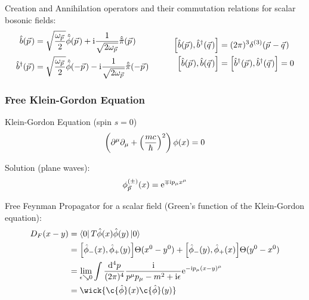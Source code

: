 			\noindent
			Creation and Annihilation operators and their commutation relations for scalar bosonic fields:
			\begin{equation}
				\begin{aligned}
					\hat{b}(\vec{p}) &= \sqrt{\frac{\omega_{\vec{p}}}{2}} \hat{\tilde{\phi}}(\vec{p}) + \i \frac{1}{\sqrt{2 \omega_{\vec{p}}}} \hat{\tilde{\pi}}(\vec{p}) \\
					\hat{b}^\dagger(\vec{p}) &= \sqrt{\frac{\omega_{\vec{p}}}{2}} \hat{\tilde{\phi}}(-\vec{p}) - \i \frac{1}{\sqrt{2 \omega_{\vec{p}}}} \hat{\tilde{\pi}}(-\vec{p}) 
				\end{aligned}				
				\hsp
				\begin{aligned}
					\comm{\hat{b}(\vec{p})}{\hat{b}^\dagger(\vec{q})} &= (2\pi)^3 \delta^{(3)}(\vec{p}-\vec{q}) \\
					\Big[ \hat{b}(\vec{p}) , \hat{b}(\vec{q}) \Big] &= \comm{\hat{b}^\dagger(\vec{p})}{\hat{b}^\dagger(\vec{q})} = 0 \\
				\end{aligned}
			\end{equation}

		\subsubsection{Free Klein-Gordon Equation}
			\noindent
			Klein-Gordon Equation (spin $s=0$)
			\begin{equation}
				\left(\partial^\mu\partial_\mu+\qty(\frac{mc}{\hbar})^2\right) \phi(x) = 0
			\end{equation}

			\noindent
			Solution (plane waves):
			\begin{equation}
				{\phi}^{ ( \pm ) }_{\vec{p}} (x) = \ex^{\mp \i p_\mu x^\mu}
			\end{equation}

			\noindent
			Free Feynman Propagator for a scalar field (\ie Green's function of the Klein-Gordon equation):
			\begin{equation}
				\begin{aligned}
					D_F (x-y) 
					&= \Bra{0} T \hat{\phi}(x)\hat{\phi}(y) \Ket{0} \\
					&= \comm{\hat{\phi}_{-}(x)}{\hat{\phi}_{+}(y)} \Theta(x^0-y^0) + \comm{\hat{\phi}_{-}(y)}{\hat{\phi}_{+}(x)} \Theta(y^0-x^0) \\
					&= \lim_{\epsilon \searrow 0} \int \frac{\dd^4 p}{(2\pi)^4} \frac{\i}{p^\mu p_\mu - m^2 + \i \epsilon} \ex^{-\i p_\mu (x-y)^\mu} \\
					&= \wick{\c{\hat{\phi}}(x) \c{\hat{\phi}}(y)} \\
				\end{aligned}
			\end{equation}

